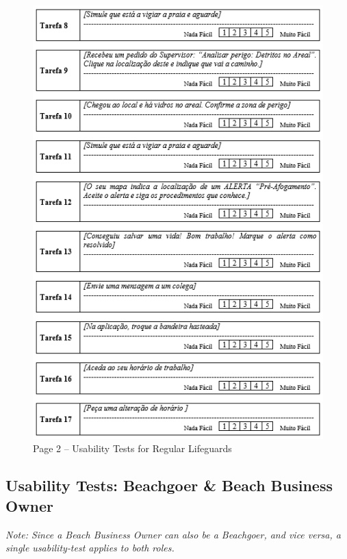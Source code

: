 \begin{figure}[H]
  \centering
  \includegraphics[width=14cm]{figs/UsabilityTest_Regular_2.png}
  \caption{Page 2 – Usability Tests for Regular Lifeguards}
  \label{fig:UsabilityTest_Regular_2}
\end{figure}

\clearpage
\subsection{Usability Tests: Beachgoer \& Beach Business Owner}
\label{section:task_beachgoer_business}

\textit{Note: Since a Beach Business Owner can also be a Beachgoer, and vice versa, a single usability‐test applies to both roles.}

